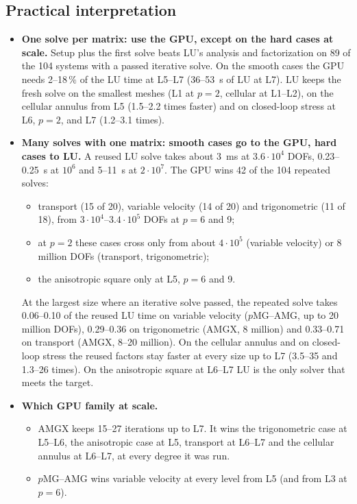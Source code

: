 \subsection{Practical interpretation}

\begin{itemize}
\item \textbf{One solve per matrix: use the GPU, except on the hard cases at scale.} Setup plus
  the first solve beats LU's analysis and factorization on 89 of the 104 systems with a passed
  iterative solve. On the smooth cases the GPU needs 2--18\,\% of the LU time at L5--L7 (36--53~s
  of LU at L7). LU keeps the fresh solve on the smallest meshes (L1 at $p=2$, cellular at L1--L2),
  on the cellular annulus from L5 (1.5--2.2 times faster) and on closed-loop stress at L6, $p=2$,
  and L7 (1.2--3.1 times).
\item \textbf{Many solves with one matrix: smooth cases go to the GPU, hard cases to LU.} A
  reused LU solve takes about 3~ms at $3.6\cdot10^4$ DOFs, 0.23--0.25~s at $10^6$ and 5--11~s at
  $2\cdot10^7$. The GPU wins 42 of the 104 repeated solves:
  \begin{itemize}
  \item transport (15 of 20), variable velocity (14 of 20) and trigonometric (11 of 18), from
    $3\cdot10^4$--$3.4\cdot10^5$ DOFs at $p=6$ and 9;
  \item at $p=2$ these cases cross only from about $4\cdot10^5$ (variable velocity) or 8 million
    DOFs (transport, trigonometric);
  \item the anisotropic square only at L5, $p=6$ and 9.
  \end{itemize}
  At the largest size where an iterative solve passed, the repeated solve takes 0.06--0.10 of
  the reused LU time on variable velocity ($p$MG--AMG, up to 20 million DOFs), 0.29--0.36 on
  trigonometric (AMGX, 8 million) and 0.33--0.71 on transport (AMGX, 8--20 million). On the cellular annulus and on
  closed-loop stress the reused factors stay faster at every size up to L7 (3.5--35 and 1.3--26
  times). On the anisotropic square at L6--L7 LU is the only solver that meets the target.
\item \textbf{Which GPU family at scale.}
  \begin{itemize}
  \item AMGX keeps 15--27 iterations up to L7. It wins the trigonometric case at L5--L6, the
    anisotropic case at L5, transport at L6--L7 and the cellular annulus at L6--L7, at every
    degree it was run.
  \item $p$MG--AMG wins variable velocity at every level from L5 (and from L3 at $p=6$).

\end{itemize}
\end{itemize}
